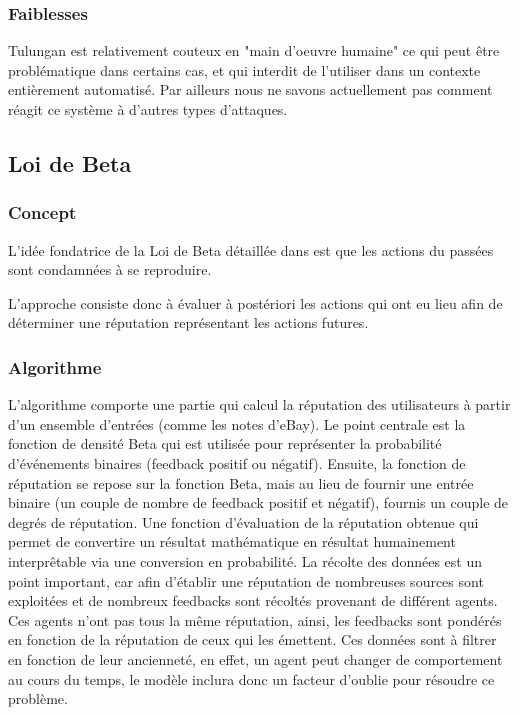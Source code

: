 \documentclass[a4paper, 11pt]{article} %
\begin{document}
\subsubsection{Faiblesses}
Tulungan est relativement couteux en "main d'oeuvre humaine" ce qui peut être problématique dans certains cas, et qui interdit de l'utiliser dans un contexte entièrement automatisé.
Par ailleurs nous ne savons actuellement pas comment réagit ce système à d'autres types d'attaques.

\subsection{Loi de Beta}
\subsubsection{Concept}
L'idée fondatrice de la Loi de Beta détaillée dans %
est que les actions du passées sont condamnées à se reproduire.

L'approche consiste donc à évaluer à postériori les actions qui ont eu lieu
afin de déterminer une réputation représentant les actions futures.

\subsubsection{Algorithme}
L'algorithme comporte une partie qui calcul la réputation des utilisateurs à partir d'un ensemble d'entrées (comme les notes d'eBay).
Le point centrale est la fonction de densité Beta qui est utilisée pour représenter la probabilité d'événements binaires (feedback positif ou négatif).
Ensuite, la fonction de réputation se repose sur la fonction Beta, mais au lieu de fournir une entrée binaire (un couple de nombre de feedback positif et négatif), fournis un couple de degrés de réputation.
Une fonction d'évaluation de la réputation obtenue qui permet de convertire un résultat mathématique en résultat humainement interprêtable via une conversion en probabilité.
La récolte des données est un point important, car afin d'établir une réputation de nombreuses sources sont exploitées et de nombreux feedbacks sont récoltés provenant de différent agents. Ces agents n'ont pas tous la même réputation, ainsi, les feedbacks sont pondérés en fonction de la réputation de ceux qui les émettent.
Ces données sont à filtrer en fonction de leur ancienneté, en effet, un agent peut changer de comportement au cours du temps, le modèle inclura donc un facteur d'oublie pour résoudre ce problème.
\end{document}
